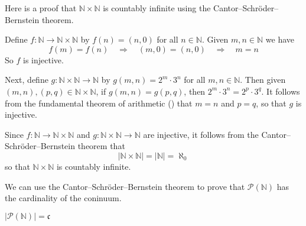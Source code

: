 \begin{example}
\label{exCardinalityOfNCrossN}
Here is a proof that $\mathbb{N} \times \mathbb{N}$ is countably infinite using the Cantor--Schr\"{o}der--Bernstein theorem.

Define $f : \mathbb{N} \to \mathbb{N} \times \mathbb{N}$ by $f(n) = (n, 0)$ for all $n \in \mathbb{N}$. Given $m,n \in \mathbb{N}$ we have
\[ f(m) = f(n) \quad \Rightarrow \quad (m,0) = (n,0) \quad \Rightarrow \quad m=n \]
So $f$ is injective.

Next, define $g : \mathbb{N} \times \mathbb{N} \to \mathbb{N}$ by $g(m,n) = 2^m \cdot 3^n$ for all $m,n \in \mathbb{N}$. Then given $(m,n), (p,q) \in \mathbb{N} \times \mathbb{N}$, if $g(m,n) = g(p,q)$, then $2^m \cdot 3^n = 2^p \cdot 3^q$. It follows from the fundamental theorem of arithmetic () that $m=n$ and $p=q$, so that $g$ is injective.

Since $f : \mathbb{N} \to \mathbb{N} \times \mathbb{N}$ and $g : \mathbb{N} \times \mathbb{N} \to \mathbb{N}$ are injective, it follows from the Cantor--Schr\"{o}der--Bernstein theorem that
\[ |\mathbb{N} \times \mathbb{N}| = |\mathbb{N}| = \aleph_0 \]
so that $\mathbb{N} \times \mathbb{N}$ is countably infinite.
\end{example}

We can use the Cantor--Schr\"{o}der--Bernstein theorem to prove that $\mathcal{P}(\mathbb{N})$ has the cardinality of the coninuum.

\begin{theorem}
\label{thmPowerSetOfNHasCardinalityC}
$|\mathcal{P}(\mathbb{N})| = \mathfrak{c}$
\end{theorem}


